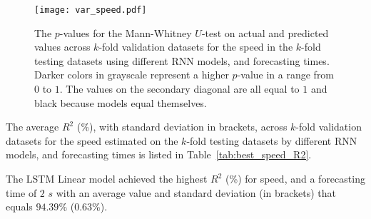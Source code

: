 \begin{figure}[!ht]
	\centering
	\texttt{[image: var\_speed.pdf]}
	\caption{The $p$-values for the Mann-Whitney $U$-test on actual and predicted values across $k$-fold validation datasets for the speed in the $k$-fold testing datasets using different RNN models, and forecasting times. Darker colors in grayscale represent a higher $p$-value in a range from $0$ to $1$. The values on the secondary diagonal are all equal to $1$ and black because models equal themselves.}
	\label{fig:var_speed}
\end{figure}

The average $R^{2}$ (\%), with standard deviation in brackets, across $k$-fold validation datasets for the speed estimated on the $k$-fold testing datasets by different RNN models, and forecasting times is listed in Table~\ref{tab:best_speed_R2}.

\begin{table}[!ht]
	\centering
	\caption{The average $R^{2}$ (\%), with standard deviation in brackets, across $k$-fold validation datasets for the speed estimated on the $k$-fold testing datasets by different RNN models, and forecasting times.}
	\label{tab:best_speed_R2}
\end{table}

The LSTM Linear model achieved the highest $R^{2}$ (\%) for speed, and a forecasting time of $2$ $s$ with an average value and standard deviation (in brackets) that equals $94.39$\% ($0.63$\%).

